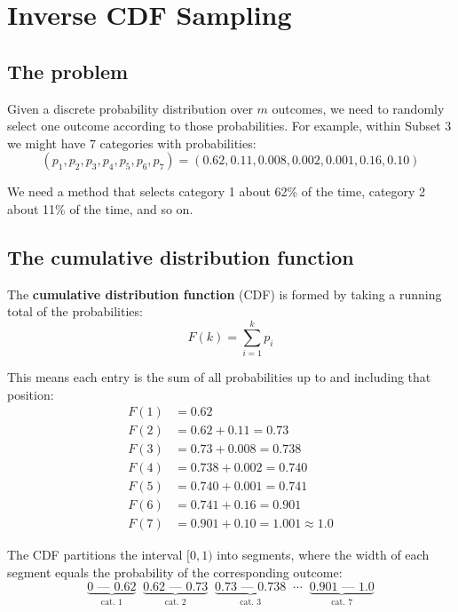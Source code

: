 \documentclass[11pt,a4paper]{article}
\theoremstyle{remark}
\begin{document}
\section{Inverse CDF Sampling}

\subsection{The problem}

Given a discrete probability distribution over $m$ outcomes, we need to randomly select one outcome according to those probabilities. For example, within Subset 3 we might have 7 categories with probabilities:
\[
(p_1, p_2, p_3, p_4, p_5, p_6, p_7) = (0.62, 0.11, 0.008, 0.002, 0.001, 0.16, 0.10)
\]

We need a method that selects category 1 about 62\% of the time, category 2 about 11\% of the time, and so on.

\subsection{The cumulative distribution function}

The \textbf{cumulative distribution function} (CDF) is formed by taking a running total of the probabilities:
\[
F(k) = \sum_{i=1}^{k} p_i
\]

This means each entry is the sum of all probabilities up to and including that position:
\begin{align*}
F(1) &= 0.62 \\
F(2) &= 0.62 + 0.11 = 0.73 \\
F(3) &= 0.73 + 0.008 = 0.738 \\
F(4) &= 0.738 + 0.002 = 0.740 \\
F(5) &= 0.740 + 0.001 = 0.741 \\
F(6) &= 0.741 + 0.16 = 0.901 \\
F(7) &= 0.901 + 0.10 = 1.001 \approx 1.0
\end{align*}

The CDF partitions the interval $[0, 1)$ into segments, where the width of each segment equals the probability of the corresponding outcome:
\[
\underbrace{0 \text{ --- } 0.62}_{\text{cat.\ 1}} \;\;
\underbrace{0.62 \text{ --- } 0.73}_{\text{cat.\ 2}} \;\;
\underbrace{0.73 \text{ --- } 0.738}_{\text{cat.\ 3}} \;\;
\cdots \;\;
\underbrace{0.901 \text{ --- } 1.0}_{\text{cat.\ 7}}
\]
\end{document}

